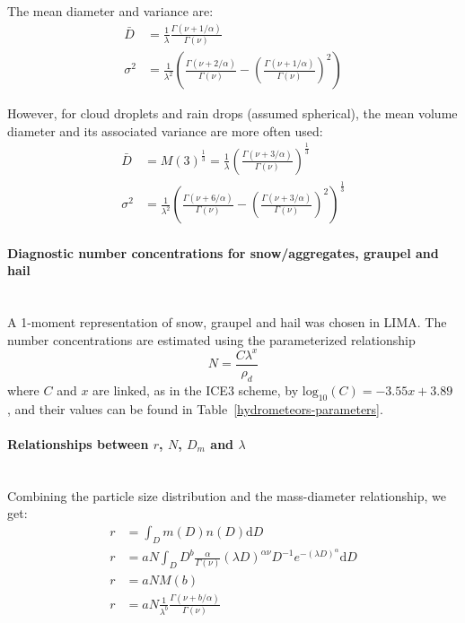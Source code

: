 The mean diameter and variance are:
\begin{align}
 \bar{D} &= \frac{1}{\lambda} \frac{\Gamma(\nu+1/\alpha)}{\Gamma(\nu)} \\
 \sigma^2 &= \frac{1}{\lambda^2} \left( \frac{\Gamma(\nu+2/\alpha)}{\Gamma(\nu)} - \left(\frac{\Gamma(\nu+1/\alpha)}{\Gamma(\nu)}\right)^2 \right)
\end{align}

However, for cloud droplets and rain drops (assumed spherical), the mean volume diameter and its associated variance are more often used:
\begin{align}
 \bar{D} &= M(3)^{\frac{1}{3}} = \frac{1}{\lambda} \left(\frac{\Gamma(\nu+3/\alpha)}{\Gamma(\nu)}\right)^{\frac{1}{3}} \\
 \sigma^2 &= \frac{1}{\lambda^2} \left( \frac{\Gamma(\nu+6/\alpha)}{\Gamma(\nu)} - \left(\frac{\Gamma(\nu+3/\alpha)}{\Gamma(\nu)}\right)^2 \right)^{\frac{1}{3}}
\end{align}

\paragraph{Diagnostic number concentrations for snow/aggregates, graupel and hail}
~\\
A 1-moment representation of snow, graupel and hail was chosen in LIMA. The number concentrations are estimated using the parameterized relationship
\begin{equation}
 N = \frac{C \lambda^x}{\rho_d}
\end{equation}
where $C$ and $x$ are linked, as in the ICE3 scheme, by $\mathrm{log}_{10}(C) = -3.55 x + 3.89$ \citep{Caniaux1993}, and their values can be found in Table~\ref{hydrometeors-parameters}.

\paragraph{Relationships between $r$, $N$, $D_m$ and $\lambda$}
~\\
Combining the particle size distribution and the mass-diameter relationship, we get:
\begin{align}
 r &= \int_D m(D) n(D) \mathrm d D \\
 r &= a N \int_D D^b \frac{\alpha}{\Gamma(\nu)} (\lambda D)^{\alpha\nu} D^{-1} e^{-(\lambda D)^{\alpha}} \mathrm d D \\
 r &= a N M(b) \\
 r &= a N \frac{1}{\lambda^b} \frac{\Gamma(\nu+b/\alpha)}{\Gamma(\nu)}
\end{align}

